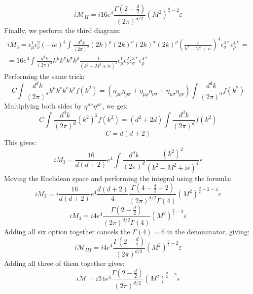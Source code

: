 \documentclass{article}
\begin{document}
\begin{equation}
    i\mathcal{M}_{II} = i16e^4 \frac{\Gamma\left(2 - \frac{d}{2}\right)}{(2\pi)^{d/2}}(M^2)^{\frac{d}{2} - 2}\varepsilon
\end{equation}
Finally, we perform the third diagram:
\begin{equation}
\begin{gathered}
    iM_3 = \epsilon^1_\mu\epsilon^2_\nu (-ie)^4 \int \frac{d^dk}{(2\pi)^d} (2k)^\mu(2k)^\nu (2k)^\sigma(2k)^\rho \left(\frac{i}{k^2 - M^2 + i\epsilon}\right)^4 \epsilon^{3*}_\sigma\epsilon^{4*}_\rho = \\ =
     16e^4 \int \frac{d^dk}{(2\pi)^d} k^\mu k^\nu k^\sigma k^\rho \frac{1}{\left(k^2 - M^2 + i\epsilon\right)^4} \epsilon^1_\mu\epsilon^2_\nu\epsilon^{3*}_\sigma\epsilon^{4*}_\rho
\end{gathered}
\end{equation}
Performing the same trick:
\begin{equation}
    C \int \frac{d^dk}{(2\pi)^d} k^\mu k^\nu k^\sigma k^\rho f(k^2) = \left(\eta_{\mu\nu}\eta_{\rho\sigma} + \eta_{\mu\rho}\eta_{\nu\sigma} + \eta_{\mu\sigma}\eta_{\rho\nu}\right)\int \frac{d^dk}{(2\pi)^d} f(k^2)
\end{equation}
Multiplying both sides by $\eta^{\mu\nu}\eta^{\rho\sigma}$, we get:
\begin{equation}
    C \int \frac{d^dk}{(2\pi)^d} (k^2)^2 f(k^2) = \left(d^2 + 2d\right)\int \frac{d^dk}{(2\pi)^d} f(k^2)
\end{equation}
\begin{equation}
    C = d(d + 2)
\end{equation}
This gives:
\begin{equation}
    iM_3 = \frac{16}{d(d + 2)}e^4 \int \frac{d^dk}{(2\pi)^d} \frac{(k^2)^2}{\left(k^2 - M^2 + i\epsilon\right)^4} \varepsilon
\end{equation}
Moving the Euclidean space and performing the integral using the formula:
\begin{equation}
    iM_3 = i\frac{16}{d(d + 2)}e^4 \frac{d(d + 2)}{4} \frac{\Gamma\left(4 - \frac{d}{2} - 2\right)}{(2\pi)^{d/2}\Gamma(4)}(M^2)^{\frac{d}{2} + 2 - 4} \varepsilon
\end{equation}
\begin{equation}
    iM_3 = i4e^4 \frac{\Gamma\left(2 - \frac{d}{2}\right)}{(2\pi)^{d/2}\Gamma(4)}(M^2)^{\frac{d}{2} - 2} \varepsilon
\end{equation}
Adding all six option together cancels the $\Gamma(4) = 6$ in the denominator, giving:
\begin{equation}
    i\mathcal{M}_{III} = i4e^4 \frac{\Gamma\left(2 - \frac{d}{2}\right)}{(2\pi)^{d/2}}(M^2)^{\frac{d}{2} - 2} \varepsilon
\end{equation}
Adding all three of them together gives:
\begin{equation}
    i\mathcal{M} = i24e^4 \frac{\Gamma\left(2 - \frac{d}{2}\right)}{(2\pi)^{d/2}}(M^2)^{\frac{d}{2} - 2} \varepsilon
\end{equation}
\end{document}
